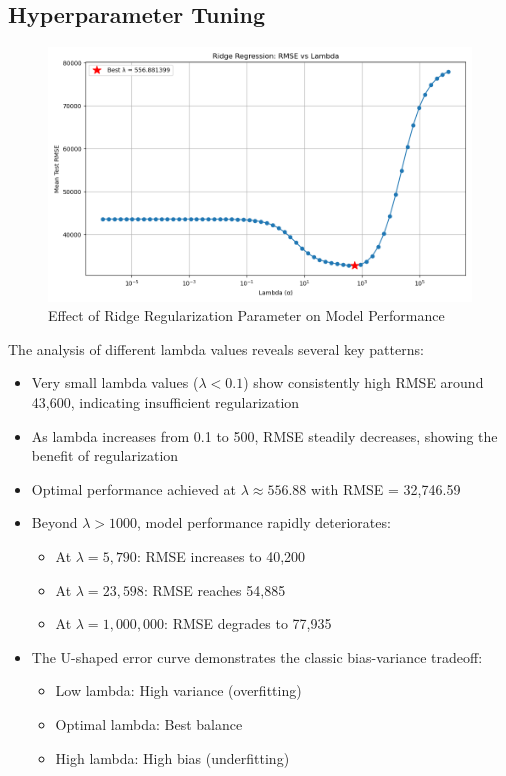 \documentclass[12pt]{report}
\begin{document}
\subsection{Hyperparameter Tuning}
\begin{figure}[H]
    \centering
    \includegraphics[width=1.0\textwidth]{figures/ridge_lambda_vs_rmse.png}
    \caption{Effect of Ridge Regularization Parameter on Model Performance}
    \label{fig:ridge_lambda}
\end{figure}

The analysis of different lambda values reveals several key patterns:
\begin{itemize}
    \item Very small lambda values ($\lambda < 0.1$) show consistently high RMSE around 43,600, indicating insufficient regularization
    \item As lambda increases from 0.1 to 500, RMSE steadily decreases, showing the benefit of regularization
    \item Optimal performance achieved at $\lambda \approx 556.88$ with RMSE = 32,746.59
    \item Beyond $\lambda > 1000$, model performance rapidly deteriorates:
    \begin{itemize}
        \item At $\lambda = 5,790$: RMSE increases to 40,200
        \item At $\lambda = 23,598$: RMSE reaches 54,885
        \item At $\lambda = 1,000,000$: RMSE degrades to 77,935
    \end{itemize}
    \item The U-shaped error curve demonstrates the classic bias-variance tradeoff:
    \begin{itemize}
        \item Low lambda: High variance (overfitting)
        \item Optimal lambda: Best balance
        \item High lambda: High bias (underfitting)
    \end{itemize}
\end{itemize}
\end{document}
